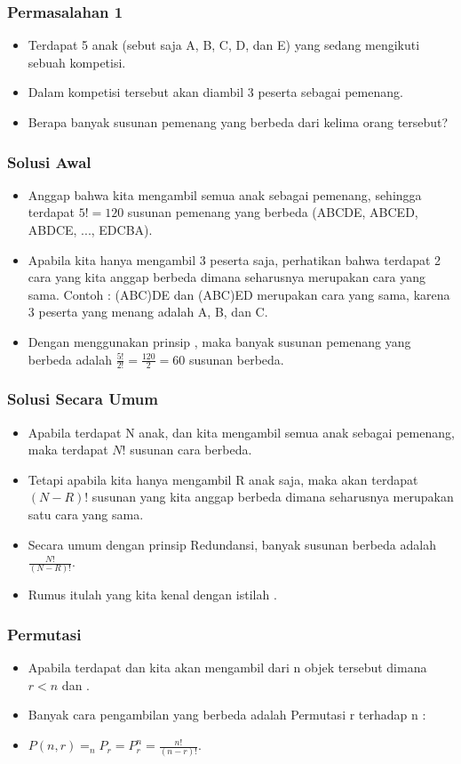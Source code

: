 \begin{frame}
\frametitle{Permasalahan 1}
\begin{itemize}
  \item Terdapat 5 anak (sebut saja A, B, C, D, dan E) yang sedang mengikuti sebuah kompetisi.
  \item Dalam kompetisi tersebut akan diambil 3 peserta sebagai pemenang.
  \item Berapa banyak susunan pemenang yang berbeda dari kelima orang tersebut?
\end{itemize}
\end{frame}

\begin{frame}
\frametitle{Solusi Awal}
\begin{itemize}
  \item Anggap bahwa kita mengambil semua anak sebagai pemenang, sehingga terdapat $5! = 120$ susunan pemenang yang berbeda (ABCDE, ABCED, ABDCE, ..., EDCBA).
  \item Apabila kita hanya mengambil 3 peserta saja, perhatikan bahwa terdapat 2 cara yang kita anggap berbeda dimana seharusnya merupakan cara yang sama. Contoh : (ABC)DE dan (ABC)ED merupakan cara yang sama, karena 3 peserta yang menang adalah A, B, dan C.
  \item Dengan menggunakan prinsip , maka banyak susunan pemenang yang berbeda adalah $\frac{5!}{2!} = \frac{120}{2} = 60$ susunan berbeda.
\end{itemize}
\end{frame}

\begin{frame}
\frametitle{Solusi Secara Umum}
\begin{itemize}
  \item Apabila terdapat N anak, dan kita mengambil semua anak sebagai pemenang, maka terdapat $N!$ susunan cara berbeda.
  \item Tetapi apabila kita hanya mengambil R anak saja, maka akan terdapat $(N-R)!$ susunan yang kita anggap berbeda dimana seharusnya merupakan satu cara yang sama.
  \item Secara umum dengan prinsip Redundansi, banyak susunan berbeda adalah $\frac{N!}{(N-R)!}$.
  \item Rumus itulah yang kita kenal dengan istilah .
\end{itemize}
\end{frame}


\begin{frame}
\frametitle{Permutasi}
\begin{itemize}
  \item Apabila terdapat  dan kita akan mengambil  dari n objek tersebut dimana $r<n$ dan .
  \item Banyak cara pengambilan yang berbeda adalah Permutasi r terhadap n : 
  \item $P(n,r) = _{n}P_{r} = P^{n}_{r} = \frac{n!}{(n-r)!}$.
\end{itemize}
\end{frame}

